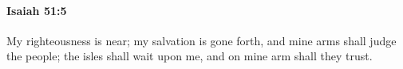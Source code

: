 
		\paragraph{Isaiah 51:5} %
			\label{ISAIAH-51-5}

			My righteousness is near; my salvation is gone forth, and mine arms shall judge the people; the isles shall wait upon me, and on mine arm shall they trust.


